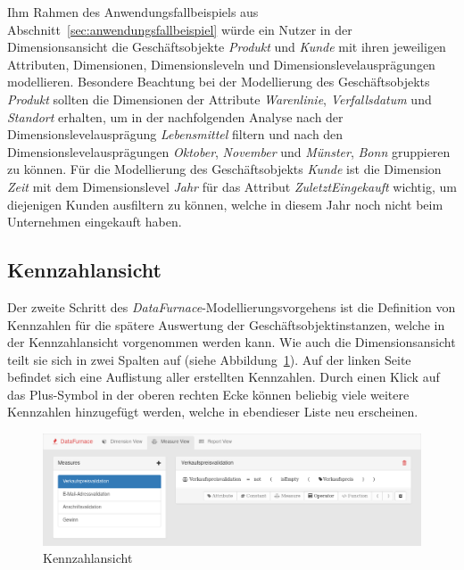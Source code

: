 \documentclass[
  language=german, %
  type=bachelor,%
  ngerman
]{isthesis}
\begin{document}
\begin{content}
  Ihm Rahmen des Anwendungsfallbeispiels aus
  Abschnitt~\ref{sec:anwendungsfallbeispiel} würde ein Nutzer in der
  Dimensionsansicht die Geschäftsobjekte \textit{Produkt} und \textit{Kunde}
  mit ihren jeweiligen Attributen, Dimensionen, Dimensionsleveln und
  Dimensionslevelausprägungen modellieren. Besondere Beachtung bei der
  Modellierung des Geschäftsobjekts \textit{Produkt} sollten die Dimensionen
  der Attribute \textit{Warenlinie}, \textit{Verfallsdatum} und
  \textit{Standort} erhalten, um in der nachfolgenden Analyse nach der
  Dimensionslevelausprägung \textit{Lebensmittel} filtern und nach den
  Dimensionslevelausprägungen \textit{Oktober}, \textit{November} und
  \textit{Münster}, \textit{Bonn} gruppieren zu können. Für die Modellierung
  des Geschäftsobjekts \textit{Kunde} ist die Dimension \textit{Zeit} mit dem
  Dimensionslevel \textit{Jahr} für das Attribut \textit{ZuletztEingekauft}
  wichtig, um diejenigen Kunden ausfiltern zu können, welche in diesem Jahr
  noch nicht beim Unternehmen eingekauft haben.


  \subsection{Kennzahlansicht}\label{subsec:kennzahlansicht}

  Der zweite Schritt des \textit{DataFurnace}-Modellierungsvorgehens ist die
  Definition von Kennzahlen für die spätere Auswertung der
  Geschäftsobjektinstanzen, welche in der Kennzahlansicht vorgenommen werden
  kann. Wie auch die Dimensionsansicht teilt sie sich in zwei Spalten auf
  (siehe Abbildung~\ref{kennzahlansicht}). Auf der linken Seite befindet sich
  eine Auflistung aller erstellten Kennzahlen.  Durch einen Klick auf das
  Plus-Symbol in der oberen rechten Ecke können beliebig viele weitere
  Kennzahlen hinzugefügt werden, welche in ebendieser Liste neu erscheinen.

  \begin{figure}
    \includegraphics[scale=0.35]{content/figures/measure-view.png}
    \caption{Kennzahlansicht}\label{kennzahlansicht}
  \end{figure}


\end{content}
\end{document}

